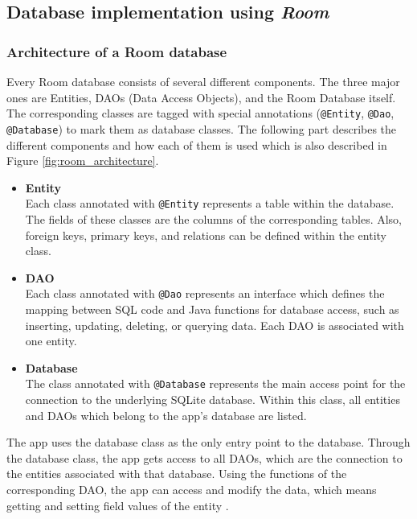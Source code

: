 \subsection{Database implementation using \textit{Room}}

\subsubsection{Architecture of a Room database}

Every Room database consists of several different components. The three major ones are Entities, DAOs (Data Access Objects), and the Room Database itself. The corresponding classes are tagged with special annotations (\texttt{@Entity}, \texttt{@Dao}, \texttt{@Database}) to mark them as database classes. The following part describes the different components and how each of them is used which is also described in Figure \ref{fig:room_architecture}. 
\begin{itemize}
	\item \textbf{Entity} \\
	Each class annotated with \texttt{@Entity} represents a table within the database. The fields of these classes are the columns of the corresponding tables. Also, foreign keys, primary keys, and relations can be defined within the entity class. 
	
	\item \textbf{DAO} \\
	Each class annotated with \texttt{@Dao} represents an interface which defines the mapping between SQL code and Java functions for database access, such as inserting, updating, deleting, or querying data. Each DAO is associated with one entity. 

	\item \textbf{Database} \\
	The class annotated with \texttt{@Database} represents the main access point for the connection to the underlying SQLite database. Within this class, all entities and DAOs which belong to the app's database are listed. 
\end{itemize}

The app uses the database class as the only entry point to the database. Through the database class, the app gets access to all DAOs, which are the connection to the entities associated with that database. Using the functions of the corresponding DAO, the app can access and modify the data, which means getting and setting field values of the entity \cite{room1, room2}.


